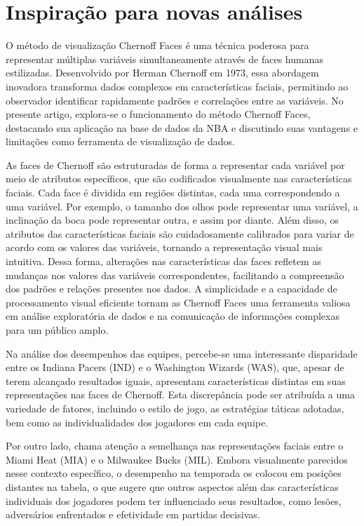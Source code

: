 \documentclass[
]{book}
\begin{document}
\hypertarget{inspirauxe7uxe3o-para-novas-anuxe1lises}{%
\chapter{Inspiração para novas análises}\label{inspirauxe7uxe3o-para-novas-anuxe1lises}}

O método de visualização Chernoff Faces é uma técnica poderosa para representar múltiplas variáveis simultaneamente através de faces humanas estilizadas. Desenvolvido por Herman Chernoff em 1973, essa abordagem inovadora transforma dados complexos em características faciais, permitindo ao observador identificar rapidamente padrões e correlações entre as variáveis. No presente artigo, explora-se o funcionamento do método Chernoff Faces, destacando sua aplicação na base de dados da NBA e discutindo suas vantagens e limitações como ferramenta de visualização de dados.

As faces de Chernoff são estruturadas de forma a representar cada variável por meio de atributos específicos, que são codificados visualmente nas características faciais. Cada face é dividida em regiões distintas, cada uma correspondendo a uma variável. Por exemplo, o tamanho dos olhos pode representar uma variável, a inclinação da boca pode representar outra, e assim por diante. Além disso, os atributos das características faciais são cuidadosamente calibrados para variar de acordo com os valores das variáveis, tornando a representação visual mais intuitiva. Dessa forma, alterações nas características das faces refletem as mudanças nos valores das variáveis correspondentes, facilitando a compreensão dos padrões e relações presentes nos dados. A simplicidade e a capacidade de processamento visual eficiente tornam as Chernoff Faces uma ferramenta valiosa em análise exploratória de dados e na comunicação de informações complexas para um público amplo.

Na análise dos desempenhos das equipes, percebe-se uma interessante disparidade entre os Indiana Pacers (IND) e o Washington Wizards (WAS), que, apesar de terem alcançado resultados iguais, apresentam características distintas em suas representações nas faces de Chernoff. Esta discrepância pode ser atribuída a uma variedade de fatores, incluindo o estilo de jogo, as estratégias táticas adotadas, bem como as individualidades dos jogadores em cada equipe.

Por outro lado, chama atenção a semelhança nas representações faciais entre o Miami Heat (MIA) e o Milwaukee Bucks (MIL). Embora visualmente parecidos nesse contexto específico, o desempenho na temporada os colocou em posições distantes na tabela, o que sugere que outros aspectos além das características individuais dos jogadores podem ter influenciado seus resultados, como lesões, adversários enfrentados e efetividade em partidas decisivas.
\end{document}
